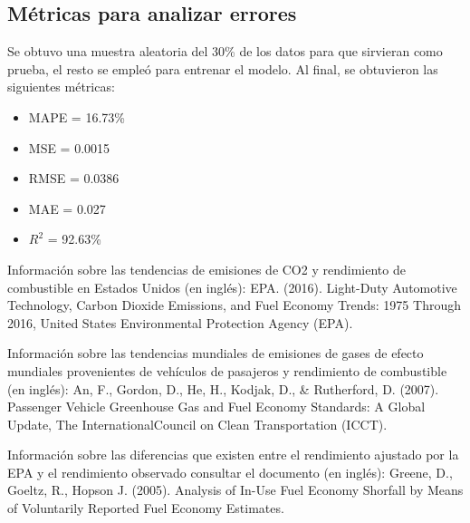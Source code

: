 \documentclass{article}
\begin{document}
\subsection{Métricas para analizar errores}

Se obtuvo una muestra aleatoria del 30\% de los datos para que sirvieran como prueba, el resto se empleó para entrenar el modelo. Al final, se obtuvieron las siguientes métricas:

\begin{itemize}
    \item MAPE = 16.73\%
    \item MSE = 0.0015
    \item RMSE = 0.0386
    \item MAE = 0.027
    \item $R^2$ = 92.63\%
\end{itemize}




Información sobre las tendencias de emisiones de CO2 y rendimiento de combustible en Estados Unidos (en inglés):
EPA. (2016). Light-Duty Automotive Technology, Carbon Dioxide Emissions, and Fuel Economy Trends: 1975 Through 2016, United States Environmental Protection Agency (EPA).

Información sobre las tendencias mundiales de emisiones de gases de efecto mundiales provenientes de vehículos de pasajeros y rendimiento de combustible (en inglés):
An, F., Gordon, D., He, H., Kodjak, D., \& Rutherford, D. (2007). Passenger Vehicle Greenhouse Gas and Fuel Economy Standards: A Global Update, The InternationalCouncil on Clean Transportation (ICCT).

Información sobre las diferencias que existen entre el rendimiento ajustado por la EPA y el rendimiento observado consultar el documento (en inglés):
Greene, D., Goeltz, R., Hopson J. (2005). Analysis of In-Use Fuel Economy Shorfall by Means of Voluntarily Reported Fuel Economy Estimates.
\end{document}
